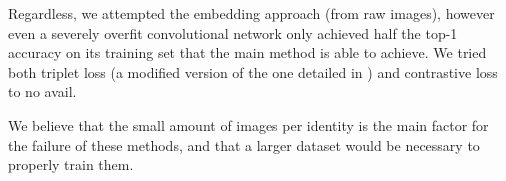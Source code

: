 Regardless, we attempted the embedding approach (from raw images), however even a severely overfit convolutional network only achieved half the top-1 accuracy on its training set that the main method is able to achieve.
We tried both triplet loss (a modified version of the one detailed in \cite{schroff2015facenet}) and contrastive loss \cite{hadsell2006dimensionality} to no avail.

We believe that the small amount of images per identity is the main factor for the failure of these methods, and that a larger dataset would be necessary to properly train them.

